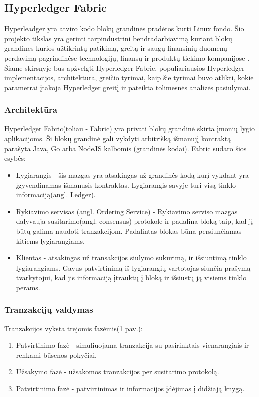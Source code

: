 \documentclass{VUMIFPSkursinis}
\begin{document}
	\subsection{Hyperledger Fabric}
		Hyperleadger yra atviro kodo blokų grandinės pradėtos kurti Linux fondo. Šio projekto tikslas yra gerinti tarpindustrini bendradarbiavimą kuriant blokų grandines kurios užtikrintų 
		patikimą, greitą ir saugų finansinių duomenų perdavimą pagrindinėse technologijų, finansų ir produktų tiekimo kompanijose \cite{LinuxHyper}. Šiame skirsnyje bus apžvelgti 
		Hyperledger Fabric, populiariausios Hyperledger implementacijos, architektūra, greičio tyrimai, kaip šie tyrimai buvo atlikti, kokie parametrai įtakoja Hyperledger greitį ir pateikta tolimesnės analizės pasiūlymai. 
		\subsubsection{Architektūra}
			Hyperledger Fabric(toliau - Fabric) yra privati blokų grandinė skirta įmonių lygio aplikacijoms. 
			Ši blokų grandinė gali vykdyti arbitrišką išmanujį kontraktą parašyta Java, Go arba NodeJS kalbomis (grandinės kodai).
			Fabric sudaro šios esybės:
			\begin{itemize}
				\item{Lygiarangis - šis mazgas yra atsakingas už grandinės kodą kurį vykdant yra įgyvendinamas išmanusis kontraktas. 
 Lygiarangis savyje turi visą tinklo informaciją(angl. Ledger). }
				\item{Rykiavimo servisas (angl. Ordering Service) - Rykiavimo serviso mazgas dalyvauja susitarimo(angl. consensus) 
protokole ir padalina bloką taip, kad jį būtų galima naudoti tranzakcijom. Padalintas blokas būna persiunčiamas kitiems lygiarangiams.}
				\item{Klientas - atsakingas už transakcijos siūlymo sukūrimą, ir išsiuntimą tinklo lygiarangiams. Gavus patvirtinimą iš lygiarangių vartotojas siunčia prašymą tvarkytojui, kad jis informaciją įtrauktų į bloką ir išsiūstų ją visiems tinklo perams.}
			\end{itemize}
		\subsubsection{Tranzakcijų valdymas}
			Tranzakcijos vyksta trejomis fazėmis(1 pav.):
			\begin{enumerate}
				\item{Patvirtinimo fazė - simuliuojama tranzakcija su pasirinktais vienarangiais ir renkami būsenos pokyčiai.}
				\item{Užsakymo fazė - užsakomos tranzakcijos per susitarimo protokolą.}
				\item{Patvirtinimo fazė - patvirtinimas ir informacijos įdėjimas į didžiają knygą.}
			\end{enumerate}
\end{document}
